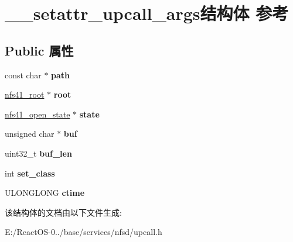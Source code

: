 \hypertarget{struct____setattr__upcall__args}{}\section{\+\_\+\+\_\+setattr\+\_\+upcall\+\_\+args结构体 参考}
\label{struct____setattr__upcall__args}
\subsection*{Public 属性}
\begin{DoxyCompactItemize}
\item 
\mbox{\label{struct____setattr__upcall__args_a43882f8d1edc3118fa9b6c2f1ae5a211}} 
const char $\ast$ {\bfseries path}
\item 
\mbox{\label{struct____setattr__upcall__args_a6816afc18022720989a6efa40e7648af}} 
\hyperlink{struct____nfs41__root}{nfs41\+\_\+root} $\ast$ {\bfseries root}
\item 
\mbox{\label{struct____setattr__upcall__args_a844d6a8ec23d349baa88d3f9393c5bf4}} 
\hyperlink{struct____nfs41__open__state}{nfs41\+\_\+open\+\_\+state} $\ast$ {\bfseries state}
\item 
\mbox{\label{struct____setattr__upcall__args_af9b27a4af218f5fbe44a4d0c41059052}} 
unsigned char $\ast$ {\bfseries buf}
\item 
\mbox{\label{struct____setattr__upcall__args_ac2afc961a049b87e06d819d7c4e1726c}} 
uint32\+\_\+t {\bfseries buf\+\_\+len}
\item 
\mbox{\label{struct____setattr__upcall__args_abaad9096043ff48ba5e7d00cc75efb50}} 
int {\bfseries set\+\_\+class}
\item 
\mbox{\label{struct____setattr__upcall__args_abd89162c3917052d672bfeb64af8a1d1}} 
U\+L\+O\+N\+G\+L\+O\+NG {\bfseries ctime}
\end{DoxyCompactItemize}


该结构体的文档由以下文件生成\+:\begin{DoxyCompactItemize}
\item 
E\+:/\+React\+O\+S-\/0../base/services/nfsd/upcall.\+h\end{DoxyCompactItemize}
